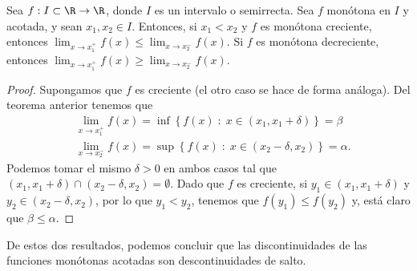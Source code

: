 \begin{ftheorem}[]
\normalfont Sea $\displaystyle f : I \subset \R \to \R $, donde $\displaystyle I $ es un intervalo o semirrecta. Sea $\displaystyle f $ monótona en $\displaystyle I $ y acotada, y sean $\displaystyle x_{1}, x_{2} \in I $. Entonces, si $\displaystyle x_{1} < x_{2} $ y $\displaystyle f $ es monótona creciente, entonces $\displaystyle \lim_{x \to x_{1}^{+}}f\left(x\right) \leq \lim_{x \to x_{2}^{-}}f\left(x\right) $. Si $\displaystyle f $ es monótona decreciente, entonces $\displaystyle \lim_{x \to x_{1}^{+}}f\left(x\right) \geq \lim_{x \to x_{2}^{-}}f\left(x\right) $.
\end{ftheorem}
\begin{proof}
Supongamos que $\displaystyle f $ es creciente (el otro caso se hace de forma análoga). Del teorema anterior tenemos que 
\[
\begin{split}
& \lim_{x \to x_{1}^{+}}f\left(x\right) = \inf \left\{ f\left(x\right) \; : \; x \in \left(x_{1}, x_{1} + \delta \right)\right\} = \beta \\
& \lim_{x \to x_{2}^{-}}f\left(x\right) = \sup \left\{ f\left(x\right) \; : \; x \in \left(x_{2}-\delta, x_{2}\right)\right\} = \alpha .
\end{split}
\]
Podemos tomar el mismo $\displaystyle \delta > 0 $ en ambos casos tal que $\displaystyle \left(x_{1}, x_{1} + \delta \right) \cap \left(x_{2}-\delta, x_{2}\right) = \emptyset $. Dado que $\displaystyle f $ es creciente, si $\displaystyle y_{1} \in \left(x_{1}, x_{1} + \delta \right) $ y $\displaystyle y_{2} \in \left(x_{2}-\delta, x_{2}\right) $, por lo que $\displaystyle y_{1} < y_{2} $, tenemos que $\displaystyle f\left(y_{1}\right) \leq f\left(y_{2}\right) $ y, está claro que $\displaystyle \beta \leq \alpha  $.
\end{proof}
\begin{observation}
\normalfont De estos dos resultados, podemos concluir que las discontinuidades de las funciones monótonas acotadas son descontinuidades de salto.
\end{observation}


